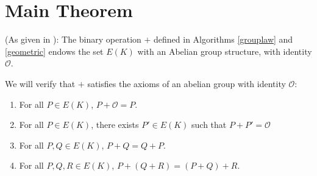 \documentclass[]{../../math_paper}
\begin{document}
\section{Main Theorem} \label{sec:thm}
\begin{maintheorem}(As given in \cite{stein2008elementary}):
    \label{thm:main}
    The binary operation $+$ defined in Algorithms \ref{grouplaw} and \ref{geometric} endows the set $E(K)$ with an Abelian group structure, with identity $\mathcal{O}$.
\end{maintheorem}
We will verify that $+$ satisfies the axioms of an abelian group with identity $\mathcal{O}$:
\begin{enumerate} [label = (\roman*)]
    \item For all $P \in E(K)$, $P + \mathcal{O} = P$.
    \item For all $P \in E(K)$, there exists $P' \in E(K)$ such that $P + P' = \mathcal{O}$
    \item For all $P, Q \in E(K)$, $P + Q = Q + P$.
    \item For all $P, Q, R \in E(K)$, $P + (Q + R) = (P + Q) + R$.
\end{enumerate}
\end{document}
